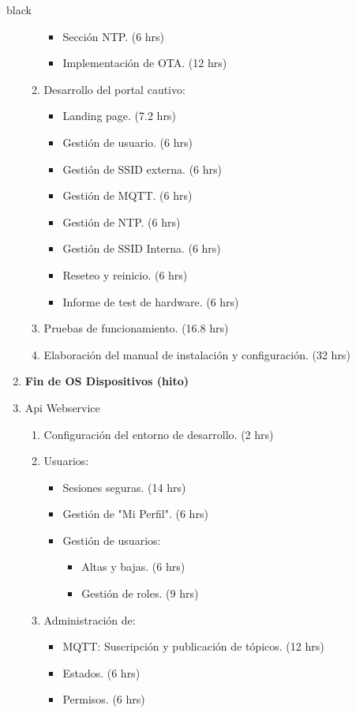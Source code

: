 \documentclass[11pt]{charter}
\begin{document}
\begin{consigna}{black}
\begin{enumerate}
\begin{enumerate}
\begin{itemize}
			\item Sección NTP. (6 hrs)
			\item Implementación de OTA. (12 hrs)
		\end{itemize}
		\item Desarrollo del portal cautivo:
		\begin{itemize}
			\item Landing page. (7.2 hrs)
			\item Gestión de usuario. (6 hrs)
			\item Gestión de SSID externa. (6 hrs)
			\item Gestión de MQTT. (6 hrs)
			\item Gestión de NTP. (6 hrs)
			\item Gestión de SSID Interna. (6 hrs)
			\item Reseteo y reinicio. (6 hrs)
			\item Informe de test de hardware. (6 hrs)
		\end{itemize}
		\item Pruebas de funcionamiento. (16.8 hrs)
		\item Elaboración del manual de instalación y configuración. (32 hrs)
	\end{enumerate}
\item \textbf{Fin de OS Dispositivos (hito)}
\item Api Webservice
	\begin{enumerate}
		\item Configuración del entorno de desarrollo. (2 hrs)
		\item Usuarios:
			\begin{itemize}
				\item Sesiones seguras. (14 hrs)
				\item Gestión de "Mi Perfil". (6 hrs)
				\item Gestión de usuarios:
				\begin{itemize}
					\item Altas y bajas. (6 hrs) 
					\item Gestión de roles. (9 hrs)
				\end{itemize}
			\end{itemize}
		\item Administración de:
			\begin{itemize}
				\item MQTT: Suscripción y publicación de tópicos. (12 hrs) 
				\item Estados. (6 hrs)
				\item Permisos. (6 hrs)  

\end{itemize}
\end{enumerate}
\end{enumerate}
\end{consigna}
\end{document}
